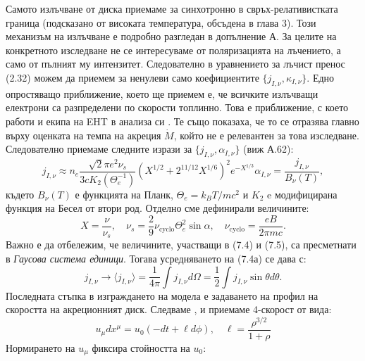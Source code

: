 Самото излъчване от диска приемаме за синхотронно в свръх-релативистката граница (подсказано от високата температура, обсъдена в глава 3). Този механизъм на излъчване е подробно разгледан в допълнение А. За целите на конкретното изследване не се интересуваме от поляризацията на лъчението, а само от пълният му интензитет. Следователно в уравнението за лъчист пренос (2.32) можем да приемем за ненулеви само коефициентите $\{j_{I,\nu}, \kappa_{I,\nu}\}.$ Едно опростяващо приближение, което ще приемем е, че всичките излъчващи електрони са разпределени по скорости топлинно. Това е приближение, с което работи и екипа на EHT в анализа си \cite{EHT_M87_VIII}. Те също показаха, че то се отразява главно върху оценката на темпа на акреция $\dot{M}$, който не е релевантен за това изследване. Следователно приемаме следните изрази за $\{j_{I,\nu}, \alpha_{I,\nu}\}$ (виж А.62):
\begin{subequations}
	\begin{equation}
		j_{I,\nu}\approx n_e \frac{\sqrt{2}\pi e^2\nu_s}{3cK_2(\Theta_e^{-1})}\left(X^{1/2} + 2^{11/12}X^{1/6}\right)^2 e^{-X^{1/3}}
	\end{equation}
	\begin{equation}
		\alpha_{I,\nu} = \frac{j_{I,\nu}}{B_\nu(T)},
	\end{equation}
\end{subequations}
където $B_\nu(T)$ е функцията на Планк, $\Theta_e = k_BT/mc^2$ и $K_2$ e модифицирана функция на Бесел от втори род. Отделно сме дефинирали величините:
\begin{equation}
	X = \frac{\nu}{\nu_s},\quad \nu_s = \frac{2}{9}\nu_\text{cyclo}\Theta_e^2\sin\alpha, \quad \nu_\text{cyclo} = \frac{eB}{2\pi m c}.
\end{equation}
Важно е да отбележим, че величините, участващи в (7.4) и (7.5), са пресметнати в \emph{Гаусова система единици}. Тогава усредняването на (7.4а) се дава с:
\begin{equation}
	j_{I,\nu}\rightarrow\langle j_{I,\nu} \rangle = \frac{1}{4\pi}\int j_{I,\nu} d\Omega = \frac{1}{2}\int j_{I,\nu} \sin\theta d\theta.
\end{equation}
Последната стъпка в изграждането на модела е задаването на профил на скоростта на акреционният диск. Следваме \cite{Broderick2021}, \cite{Gold2020} и приемаме 4-скорост от вида:
\begin{equation}
	u_\mu dx^\mu = u_0(-dt + \ell d\phi),\quad \ell = \frac{\rho^{3/2}}{1 +\rho}
\end{equation}
Нормирането на $u_\mu$ фиксира стойността на $u_0$:
